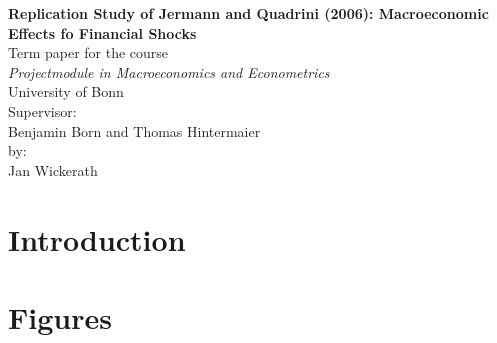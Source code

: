 \documentclass[a4paper,12pt,titlepage]{article}
\begin{document}
\begin{titlepage}
\begin{center}

\textbf{\Huge Replication Study of Jermann and Quadrini (2006): Macroeconomic
  Effects fo Financial Shocks}
\\[5cm]
\Large 
Term paper for the course\\
\textit{Projectmodule in Macroeconomics and Econometrics}\\
University of Bonn\\
\vfill
Supervisor: \\
Benjamin Born and Thomas Hintermaier\\[2cm]

by:\\
Jan Wickerath\\


\end{center}
\end{titlepage}

\thispagestyle{empty}

\newpage

\setcounter{page}{1}

\thispagestyle{empty}

\section{Introduction}
\label{sec:intro}
\blindtext




\newpage

\appendix


\section{Figures}

\newpage
% 
% 
\end{document}
